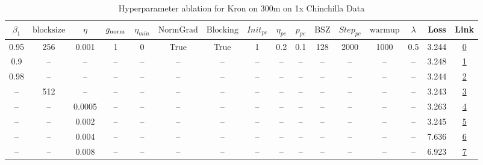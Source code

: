 \begin{table}[H]
\centering
\caption{Hyperparameter ablation for Kron on 300m on 1x Chinchilla Data}
\label{tab:ablation_kron_300m_on_1x_chinchilla_data}
\begin{tabular}{cccccccccccccccc}
\toprule
$\beta_1$ & $\mathrm{block size}$ & $\eta$ & $g_{\mathrm{norm}}$ & $\eta_{min}$ & $\mathrm{NormGrad}$ & $\mathrm{Blocking}$ & $Init_{pc}$ & $\eta_{pc}$ & $p_{pc}$ & $\mathrm{BSZ}$ & $Step_{pc}$ & $\mathrm{warmup}$ & $\lambda$ & Loss & Link \\
\midrule
0.95 & 256 & 0.001 & 1 & 0 & True & True & 1 & 0.2 & 0.1 & 128 & 2000 & 1000 & 0.5 & 3.244 & \href{https://wandb.ai/marin-community/optimizer-scaling/runs/sweep-300m-6B-kron9fb147lr0.001-wd0.5-b10.95-plr0.2-pis1-gn1-nor-d54c60}{0} \\
\midrule
0.9 & -- & -- & -- & -- & -- & -- & -- & -- & -- & -- & -- & -- & -- & 3.248 & \href{https://wandb.ai/marin-community/optimizer-scaling/runs/sweep-300m-6B-kron9ac4c0lr0.001-wd0.5-b10.9-plr0.2-pis1-gn1-norm-2f58ed}{1} \\
0.98 & -- & -- & -- & -- & -- & -- & -- & -- & -- & -- & -- & -- & -- & 3.244 & \href{https://wandb.ai/marin-community/optimizer-scaling/runs/sweep-300m-6B-kron06f9b7lr0.001-wd0.5-b10.98-plr0.2-pis1-gn1-nor-67674b}{2} \\
-- & 512 & -- & -- & -- & -- & -- & -- & -- & -- & -- & -- & -- & -- & 3.243 & \href{https://wandb.ai/marin-community/optimizer-scaling/runs/sweep-300m-6B-kron1bfdd1lr0.001-wd0.5-b10.95-plr0.2-pis1-gn1-nor-534bfe}{3} \\
-- & -- & 0.0005 & -- & -- & -- & -- & -- & -- & -- & -- & -- & -- & -- & 3.263 & \href{https://wandb.ai/marin-community/optimizer-scaling/runs/sweep-300m-6B-kron4eb26flr0.0005-wd0.5-b10.95-plr0.2-pis1-gn1-no-3b9228}{4} \\
-- & -- & 0.002 & -- & -- & -- & -- & -- & -- & -- & -- & -- & -- & -- & 3.245 & \href{https://wandb.ai/marin-community/optimizer-scaling/runs/sweep-300m-6B-krond49014lr0.002-wd0.5-b10.95-plr0.2-pis1-gn1-nor-b57c7c}{5} \\
-- & -- & 0.004 & -- & -- & -- & -- & -- & -- & -- & -- & -- & -- & -- & 7.636 & \href{https://wandb.ai/marin-community/optimizer-scaling/runs/sweep-300m-6B-kron351c0clr0.004-wd0.5-b10.95-plr0.2-pis1-gn1-nor-dea42d}{6} \\
-- & -- & 0.008 & -- & -- & -- & -- & -- & -- & -- & -- & -- & -- & -- & 6.923 & \href{https://wandb.ai/marin-community/optimizer-scaling/runs/sweep-300m-6B-kronb28e04lr0.008-wd0.5-b10.95-plr0.2-pis1-gn1-nor-8d91a1}{7} \\

\end{tabular}
\end{table}
